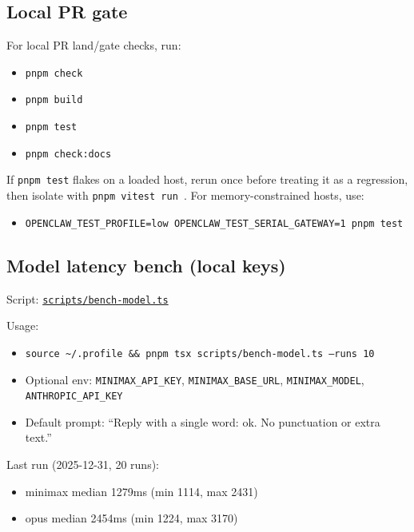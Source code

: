 \subsection{Local PR gate}


For local PR land/gate checks, run:

\begin{itemize}
  \item \texttt{pnpm check}
  \item \texttt{pnpm build}
  \item \texttt{pnpm test}
  \item \texttt{pnpm check:docs}
\end{itemize}


If \texttt{pnpm test} flakes on a loaded host, rerun once before treating it as a regression, then isolate with \texttt{pnpm vitest run }. For memory-constrained hosts, use:

\begin{itemize}
  \item \texttt{OPENCLAW\_TEST\_PROFILE=low OPENCLAW\_TEST\_SERIAL\_GATEWAY=1 pnpm test}
\end{itemize}


\subsection{Model latency bench (local keys)}


Script: \href{https://github.com/openclaw/openclaw/blob/main/scripts/bench-model.ts}{\texttt{scripts/bench-model.ts}}

Usage:

\begin{itemize}
  \item \texttt{source \textasciitilde{}/.profile \&\& pnpm tsx scripts/bench-model.ts --runs 10}
  \item Optional env: \texttt{MINIMAX\_API\_KEY}, \texttt{MINIMAX\_BASE\_URL}, \texttt{MINIMAX\_MODEL}, \texttt{ANTHROPIC\_API\_KEY}
  \item Default prompt: “Reply with a single word: ok. No punctuation or extra text.”
\end{itemize}


Last run (2025-12-31, 20 runs):

\begin{itemize}
  \item minimax median 1279ms (min 1114, max 2431)
  \item opus median 2454ms (min 1224, max 3170)
\end{itemize}


